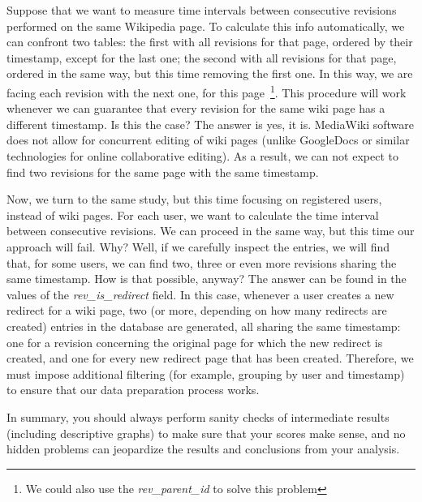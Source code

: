 Suppose that we want to measure time intervals between consecutive revisions performed
on the same Wikipedia page. To calculate this info automatically, we can confront two
tables: the first with all revisions for that page, ordered by their timestamp, except
for the last one; the second with all revisions for that page, ordered in the same way,
but this time removing the first one. In this way, we are facing each revision with the
next one, for this page~\footnote{We could also use the \textit{rev\_parent\_id} to
solve this problem}. This procedure will work whenever we can guarantee that every revision
for the same wiki page has a different timestamp. Is this the case? The answer is yes,
it is. MediaWiki software does not allow for concurrent editing of wiki pages (unlike
GoogleDocs or similar technologies for online collaborative editing). As a result, we
can not expect to find two revisions for the same page with the same timestamp.

Now, we turn to the same study, but this time focusing on registered users, instead
of wiki pages. For each user, we want to calculate the time interval between consecutive
revisions. We can proceed in the same way, but this time our approach will fail.
Why? Well, if we carefully inspect the entries, we will find that, for some users,
we can find two, three or even more revisions sharing the same timestamp. How is that
possible, anyway? The answer can be found in the values of the \textit{rev\_is\_redirect}
field. In this case, whenever a user creates a new redirect for a wiki page, two (or
more, depending on how many redirects are created) entries in the database are generated,
all sharing the same timestamp: one for a revision concerning the original page for
which the new redirect is created, and one for every new redirect page that has been
created. Therefore, we must impose additional filtering (for example, grouping by
user and timestamp) to ensure that our data preparation process works.

In summary, you should always perform sanity checks of intermediate results (including
descriptive graphs) to make sure that your scores make sense, and no hidden problems
can jeopardize the results and conclusions from your analysis.

% 

